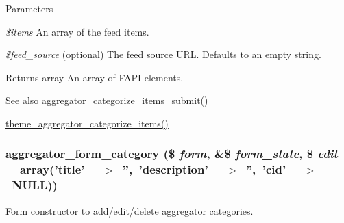 \begin{DoxyParams}{Parameters}
\item[{\em \$items}]An array of the feed items. \item[{\em \$feed\_\-source}](optional) The feed source URL. Defaults to an empty string.\end{DoxyParams}
\begin{DoxyReturn}{Returns}
array An array of FAPI elements.
\end{DoxyReturn}
\begin{DoxySeeAlso}{See also}
\hyperlink{aggregator_8pages_8inc_a04d005d45c0430ec3b97884ef4470d4f}{aggregator\_\-categorize\_\-items\_\-submit()} 

\hyperlink{group__themeable_gaa166f4c160bdff7532ce6b75a8588d02}{theme\_\-aggregator\_\-categorize\_\-items()} 
\end{DoxySeeAlso}
\hypertarget{group__forms_gaf977e902973833a5a8fe5431ba5b829d}{
\subsubsection[{aggregator\_\-form\_\-category}]{\setlength{\rightskip}{0pt plus 5cm}aggregator\_\-form\_\-category (\$ {\em form}, \/  \&\$ {\em form\_\-state}, \/  \$ {\em edit} = {\ttfamily array('title'~=$>$~'',~'description'~=$>$~'',~'cid'~=$>$~NULL)})}}
\label{group__forms_gaf977e902973833a5a8fe5431ba5b829d}
Form constructor to add/edit/delete aggregator categories.


